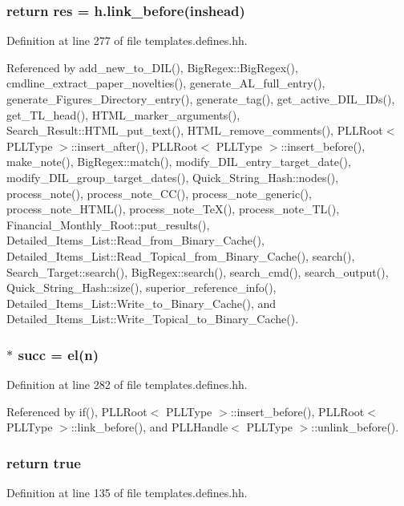 \subsubsection{\setlength{\rightskip}{0pt plus 5cm}return res = h.link\_\-before(inshead)}\label{templates_8defines_8hh_a11}




Definition at line 277 of file templates.defines.hh.

Referenced by add\_\-new\_\-to\_\-DIL(), Big\-Regex::Big\-Regex(), cmdline\_\-extract\_\-paper\_\-novelties(), generate\_\-AL\_\-full\_\-entry(), generate\_\-Figures\_\-Directory\_\-entry(), generate\_\-tag(), get\_\-active\_\-DIL\_\-IDs(), get\_\-TL\_\-head(), HTML\_\-marker\_\-arguments(), Search\_\-Result::HTML\_\-put\_\-text(), HTML\_\-remove\_\-comments(), PLLRoot$<$ PLLType $>$::insert\_\-after(), PLLRoot$<$ PLLType $>$::insert\_\-before(), make\_\-note(), Big\-Regex::match(), modify\_\-DIL\_\-entry\_\-target\_\-date(), modify\_\-DIL\_\-group\_\-target\_\-dates(), Quick\_\-String\_\-Hash::nodes(), process\_\-note(), process\_\-note\_\-CC(), process\_\-note\_\-generic(), process\_\-note\_\-HTML(), process\_\-note\_\-Te\-X(), process\_\-note\_\-TL(), Financial\_\-Monthly\_\-Root::put\_\-results(), Detailed\_\-Items\_\-List::Read\_\-from\_\-Binary\_\-Cache(), Detailed\_\-Items\_\-List::Read\_\-Topical\_\-from\_\-Binary\_\-Cache(), search(), Search\_\-Target::search(), Big\-Regex::search(), search\_\-cmd(), search\_\-output(), Quick\_\-String\_\-Hash::size(), superior\_\-reference\_\-info(), Detailed\_\-Items\_\-List::Write\_\-to\_\-Binary\_\-Cache(), and Detailed\_\-Items\_\-List::Write\_\-Topical\_\-to\_\-Binary\_\-Cache().
\subsubsection{$\ast$ succ = el(n)}\label{templates_8defines_8hh_a13}




Definition at line 282 of file templates.defines.hh.

Referenced by if(), PLLRoot$<$ PLLType $>$::insert\_\-before(), PLLRoot$<$ PLLType $>$::link\_\-before(), and PLLHandle$<$ PLLType $>$::unlink\_\-before().
\subsubsection{\setlength{\rightskip}{0pt plus 5cm}return true}\label{templates_8defines_8hh_a9}




Definition at line 135 of file templates.defines.hh.